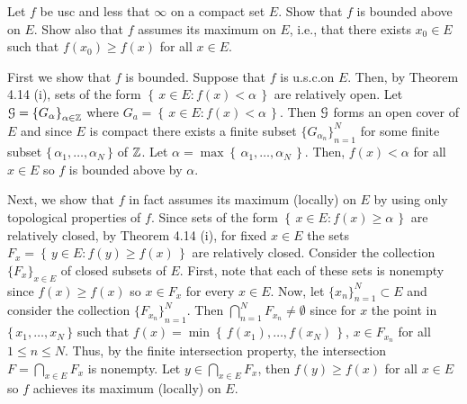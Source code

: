 \begin{problem}
  Let $f$ be usc and less that $\infty$ on a compact set $E$. Show that $f$
  is bounded above on $E$. Show also that $f$ assumes its maximum on $E$,
  i.e., that there exists $x_0\in E$ such that $f(x_0)\geq f(x)$ for all
  $x\in E$.
\end{problem}
\begin{solution}
  First we show that $f$ is bounded. Suppose that $f$ is u.s.c.\@ on
  $E$. Then, by Theorem 4.14 (i), sets of the form
  $\left\{\,x\in E:f(x)<\alpha\,\right\}$ are relatively open. Let
  $\mathcal{G}={\{G_\alpha\}}_{\alpha\in\mathbb{Z}}$ where
  $G_a=\left\{\,x\in E:f(x)<\alpha\,\right\}$. Then $\mathcal{G}$ forms an open
  cover of $E$ and since $E$ is compact there exists a finite subset
  ${\{G_{\alpha_n}\}}_{n=1}^N$ for some finite subset
  $\{\,\alpha_1,\ldots,\alpha_N\,\}$ of $\mathbb{Z}$. Let
  $\alpha=\max\left\{\,\alpha_1,\ldots,\alpha_N\,\right\}$. Then,
  $f(x)<\alpha$ for all $x\in E$ so $f$ is bounded above by $\alpha$.

  Next, we show that $f$ in fact assumes its maximum (locally) on $E$ by
  using only topological properties of $f$. Since sets of the form
  $\left\{\,x\in E:f(x)\geq\alpha\,\right\}$ are relatively closed, by
  Theorem 4.14 (i), for fixed $x\in E$ the sets
  $F_x=\left\{\,y\in E:f(y)\geq f(x)\,\right\}$ are relatively
  closed. Consider the collection ${\{F_x\}}_{x\in E}$ of closed subsets of
  $E$. First, note that each of these sets is nonempty since
  $f(x)\geq f(x)$ so $x\in F_x$ for every $x\in E$. Now, let
  ${\{x_n\}}_{n=1}^N\subset E$ and consider the collection
  ${\{F_{x_n}\}}_{n=1}^N$. Then $\bigcap_{n=1}^N F_{x_n}\neq\emptyset$
  since for $x$ the point in $\{\,x_1,\ldots,x_N\,\}$ such that
  $f(x)=\min\left\{\,f(x_1),\ldots,f(x_N)\,\right\}$, $x\in F_{x_n}$ for
  all $1\leq n\leq N$. Thus, by the finite intersection property, the
  intersection $F=\bigcap_{x\in E}F_x$ is nonempty. Let
  $y\in\bigcap_{x\in E} F_x$, then $f(y)\geq f(x)$ for all $x\in E$ so $f$
  achieves its maximum (locally) on $E$.
\end{solution}

